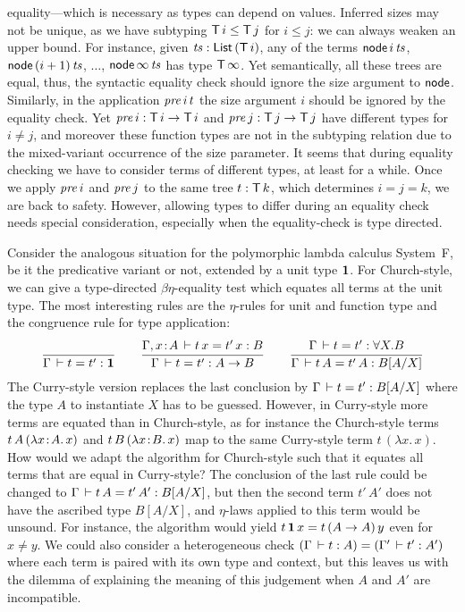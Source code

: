 \documentclass[acmsmall,screen]{acmart}\settopmatter{}
\begin{document}
equality---which is necessary as types can depend on values.  Inferred
sizes may not be unique, as we have subtyping $\mathsf{T}\,i \leq \mathsf{T}\,j$ for
$i \leq j$: we can always weaken an upper bound.  For instance, given
$\mathit{ts} : \mathsf{List}\,(\mathsf{T}\,i)$, any of the terms
$\mathsf{node}\,i\,\mathit{ts}$, $\mathsf{node}\,(i+1)\,\mathit{ts}$, $\dots$, $\mathsf{node}\,\infty\,\mathit{ts}$
has type
$\mathsf{T}\,\infty$.  Yet semantically, all these trees are equal,
thus, the syntactic equality check should ignore the size argument to
$\mathsf{node}$.  Similarly, in the application $\mathit{pre}\,i\,t$ the size
argument $i$ should be ignored by the equality check.  Yet
$\mathit{pre}\,i : \mathsf{T}\,i \to \mathsf{T}\,i$ and $\mathit{pre}\,j : \mathsf{T}\,j \to \mathsf{T}\,j$ have
different types for $i \not= j$, and moreover these function types are
not in the subtyping relation due to the mixed-variant occurrence of the
size parameter.  It seems that during equality checking we have to
consider terms of different types, at least for a while.  Once we apply
$\mathit{pre}\,i$ and $\mathit{pre}\,j$ to the same tree $t : \mathsf{T}\,k$, which
determines $i = j = k$, we are back to safety.  However, allowing
types to differ during an equality check needs special consideration, especially
when the equality-check is type directed.

Consider the analogous situation for the polymorphic lambda calculus System~F, be it the predicative variant or not, extended by a unit type $\mathbf{1}$.
For Church-style, we can give a type-directed $\beta\eta$-equality test which equates all terms at the unit type.  The most interesting rules are the $\eta$-rules for unit and function type and the congruence rule for type application:
\begin{gather*}
\renewcommand{\jchk}{:}
\renewcommand{\jinf}{:}
  \ru{}{\Gamma \der t = t' \jchk \One}
\qquad
  \ru{\Gamma, x \of A \der t\,x = t'\,x \jchk B
    }{\Gamma \der t = t' \jchk A \to B}
\qquad
  \ru{\Gamma \der t = t' \jinf \forall X. B
    }{\Gamma \der t\,A = t'\,A \jinf B[A/X]}
\end{gather*}
The Curry-style version replaces the last conclusion by $\Gamma \,\vdash t = t' : B[A/X]$ where the type $A$ to instantiate $X$ has to be guessed.  However, in Curry-style more terms are equated than in Church-style, as for instance the Church-style terms $t\,A\,(\lambda x \!:\! A.\, x)$ and $t\,B\,(\lambda x \!:\! B.\, x)$ map to the same Curry-style term $t\,(\lambda x.\,x)$.  How would we adapt the algorithm for Church-style such that it equates all terms that are equal in Curry-style?  The conclusion of the last rule could be changed to $\Gamma \,\vdash t\,A = t'\,A' : B[A/X]$, but then the second term $t'\,A'$ does not have the ascribed type $B[A/X]$, and $\eta$-laws applied to this term would be unsound.  For instance, the algorithm would yield $t\,\mathbf{1}\,x = t\,(A \to A)\,y$ even for $x \not= y$.
We could also consider a heterogeneous check $(\Gamma \,\vdash t : A) = (\Gamma' \,\vdash t' : A')$ where each term is paired with its own type and context, but this leaves us with the dilemma of explaining the meaning of this judgement when $A$ and $A'$ are incompatible.
\end{document}
